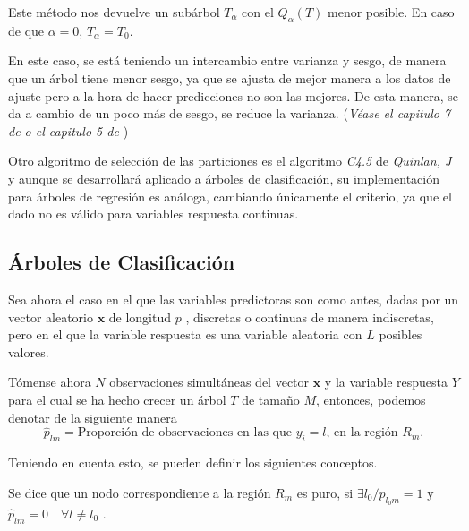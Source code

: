 \noindent Este método nos devuelve un subárbol $T_{\alpha}$ con el $Q_{\alpha}(T)$ menor posible. En caso de que $\alpha=0$, $T_{\alpha}=T_0$.

\noindent En este caso, se está teniendo un intercambio entre varianza y sesgo, de manera que un árbol tiene menor sesgo, ya que se ajusta de mejor manera a los datos de ajuste pero a la hora de hacer predicciones no son las mejores. De esta manera, se da a cambio de un poco más de sesgo, se reduce la varianza. (\emph{Véase el capitulo 7 de \cite{Hastie 2001} o el capitulo 5 de \cite{James 2013} })

\noindent Otro algoritmo de selección de las particiones es el algoritmo \emph{C4.5} de \emph{Quinlan, J}\cite{Quinlan 2014} y aunque se desarrollará aplicado a árboles de clasificación, su implementación para árboles de regresión es análoga, cambiando únicamente el criterio, ya que el dado no es válido para variables respuesta continuas. 

\subsection{Árboles de Clasificación}

\noindent Sea ahora el caso en el que las variables predictoras son como antes, dadas por un vector aleatorio $\mathbf{x}$ de longitud $p$ , discretas o continuas de manera indiscretas, pero en el que la variable respuesta es una variable aleatoria con $L$ posibles valores.

\noindent Tómense ahora $N$ observaciones simultáneas del vector $\mathbf{x}$ y la variable respuesta $Y$ para el cual se ha hecho crecer un árbol $T$ de tamaño $M$, entonces, podemos denotar de la siguiente manera \cite{Divakaran 2022, Brown 2004}
\begin{equation}
\hat{p}_{lm}=\text{Proporción de observaciones en las que $y_i=l$, en la región $R_m$.}
\end{equation}

\noindent Teniendo en cuenta esto, se pueden definir los siguientes conceptos.
\begin{defi}
Se dice que un nodo correspondiente a la región $R_m$ es puro, si $\exists l_0/ p_{l_0 m}=1$ y $\hat{p}_{lm}=0 \quad \forall l\neq l_0$ \cite{Divakaran 2022, Hastie 2001, James 2013, Brown 2004}. 
\end{defi}

